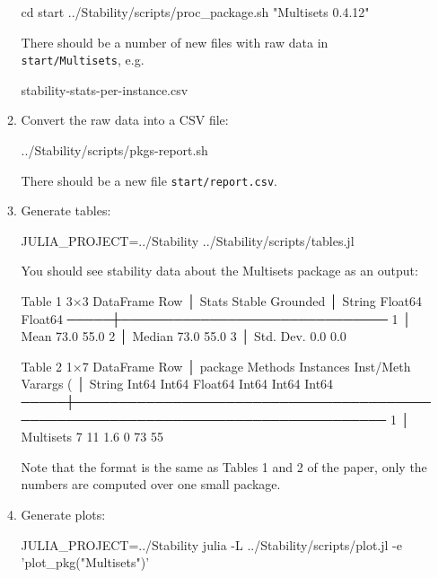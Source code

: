 \documentclass[
]{article}
\begin{document}
\begin{enumerate}
\begin{enumerate}
\begin{verbnobox}[\small]
cd start
../Stability/scripts/proc_package.sh "Multisets 0.4.12"
\end{verbnobox}

    There should be a number of new files with raw data in
    \texttt{start/Multisets},
    e.g.

\begin{verbnobox}[\small]
stability-stats-per-instance.csv
\end{verbnobox}

  \item
    Convert the raw data into a CSV file:

\begin{verbnobox}[\small]
../Stability/scripts/pkgs-report.sh
\end{verbnobox}

    There should be a new file \texttt{start/report.csv}.
  \item
    Generate tables:

\begin{verbnobox}[\small]
JULIA_PROJECT=../Stability ../Stability/scripts/tables.jl
\end{verbnobox}

    You should see stability data about the Multisets package as an
    output:

\begin{verbnobox}[\small]
 Table 1
 3×3 DataFrame
  Row │ Stats      Stable   Grounded 
      │ String     Float64  Float64  
 ─────┼──────────────────────────────
    1 │ Mean          73.0      55.0
    2 │ Median        73.0      55.0
    3 │ Std. Dev.      0.0       0.0
\end{verbnobox}

\begin{verbnobox}[\small]
 Table 2
 1×7 DataFrame
  Row │ package    Methods  Instances  Inst/Meth  Varargs (%
      │ String     Int64    Int64      Float64    Int64        Int64       Int64        
 ─────┼─────────────────────────────────────────────────────────────────────────────────
    1 │ Multisets        7         11        1.6            0          73            55
\end{verbnobox}

    Note that the format is the same as Tables 1 and 2 of the paper,
    only the numbers are computed over one small package.
  \item
    Generate plots:

\begin{verbnobox}[\small]
JULIA_PROJECT=../Stability julia -L ../Stability/scripts/plot.jl -e 'plot_pkg("Multisets")'
\end{verbnobox}


\end{enumerate}
\end{enumerate}
\end{document}

